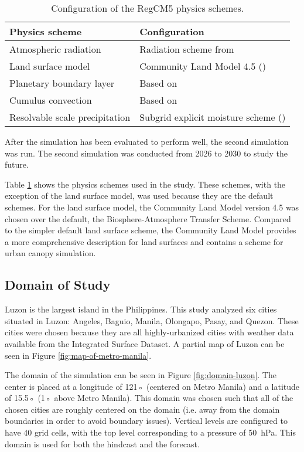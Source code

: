 	\begin{table}	
		\caption{Configuration of the RegCM5 physics schemes.}
		\label{tab:physics-schemes}
		\centering
		\begin{tabular}{l l}
			\hline \hline
			Physics scheme & Configuration\\
			\hline
			Atmospheric radiation & Radiation scheme from \textcite{Kiehl1996} \\
			Land surface model & Community Land Model 4.5 (\cite{Oleson2013})\\
			Planetary boundary layer & Based on \textcite{Holtslag1990}\\
			Cumulus convection & Based on \textcite{Emanuel1991}\\
			Resolvable scale precipitation & Subgrid explicit moisture scheme (\cite{Pal2000})\\
			\hline
		\end{tabular}		
	\end{table}
	
	After the simulation has been evaluated to perform well, the second simulation was run.
	The second simulation was conducted from 2026 to 2030 to study the future.
	
	Table \ref{tab:physics-schemes} shows the physics schemes used in the study.
	These schemes, with the exception of the land surface model, was used because they are the default schemes. 
	For the land surface model, the Community Land Model version 4.5 was chosen over the default, the Biosphere-Atmosphere Transfer Scheme. 
	Compared to the simpler default land surface scheme, the Community Land Model provides a more comprehensive description for land surfaces and contains a scheme for urban canopy simulation.
	
	\subsection{Domain of Study}
		Luzon is the largest island in the Philippines.
		This study analyzed six cities situated in Luzon:
		Angeles,
		Baguio,
		Manila,
		Olongapo,
		Pasay,
		and
		Quezon.
		These cities were chosen because they are all highly-urbanized cities with weather data available from the Integrated Surface Dataset.
		A partial map of Luzon can be seen in Figure \ref{fig:map-of-metro-manila}.
		
		The domain of the simulation can be seen in Figure \ref{fig:domain-luzon}.
		The center is placed at a longitude of 121◦ (centered on Metro Manila) and a latitude of 15.5◦ (1◦ above Metro Manila).
		This domain was chosen such that all of the chosen cities are roughly centered on the domain (i.e. away from the domain boundaries in order to avoid boundary issues).
		Vertical levels are configured to have 40 grid cells, with the top level corresponding to a pressure of \qty{50}{hPa}.
		This domain is used for both the hindcast and the forecast.
		
